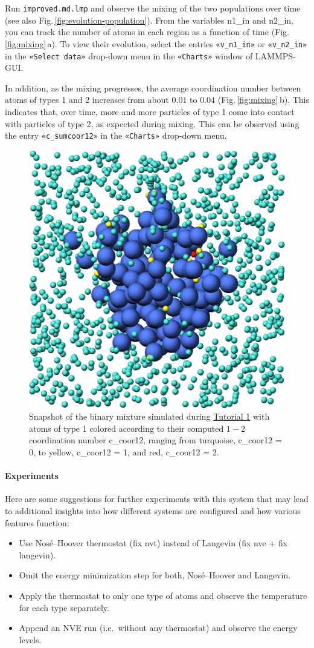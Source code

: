 \documentclass[9pt,tutorial]{livecoms}
\newcommand{\lmpcmd}[1]{\hspace{0pt}\colorbox{listing}{\textcolor{command}{\small{#1}}}\hspace{0pt}} %
\newcommand{\flecmd}[1]{\textcolor{command}{\texttt{#1}}} %
\newcommand{\guicmd}[1]{\textcolor{command}{\texttt{«#1»}}} %
\begin{document}
Run \flecmd{improved.md.lmp} and observe the mixing of the two populations
over time (see also Fig.\,\ref{fig:evolution-population}).  From the
variables \lmpcmd{n1\_in} and \lmpcmd{n2\_in}, you can track the number
of atoms in each region as a function of time
(Fig.\,\ref{fig:mixing}\,a).  To view their evolution, select the entries
\guicmd{v\_n1\_in} or \guicmd{v\_n2\_in} in the \guicmd{Select data} drop-down
menu in the \guicmd{Charts} window of LAMMPS-GUI.

In addition, as the mixing progresses, the average coordination number
between atoms of types 1 and 2 increases from about $0.01$ to $0.04$
(Fig.\,\ref{fig:mixing}\,b).  This indicates that, over time, more and
more particles of type 1 come into contact with particles of type 2, as
expected during mixing.  This can be observed using the entry
\guicmd{c\_sumcoor12} in the \guicmd{Charts} drop-down menu.

\begin{figure}
\centering
\includegraphics[width=0.55\linewidth]{LJ-coords}
\caption{Snapshot of the binary mixture simulated
  during \hyperref[lennard-jones-label]{Tutorial 1} with atoms of type 1
  colored according to their computed $1-2$ coordination
  number \lmpcmd{c\_coor12}, ranging from turquoise, \lmpcmd{c\_coor12 = 0},
  to yellow, \lmpcmd{c\_coor12 = 1}, and red, \lmpcmd{c\_coor12 = 2}.}
\label{fig:coords-viz}
\end{figure}

\paragraph{Experiments}

Here are some suggestions for further experiments with this system that
may lead to additional insights into how different systems are configured
and how various features function:
\begin{itemize}
\item Use Nos\'e--Hoover thermostat (\lmpcmd{fix nvt}) instead of Langevin
  (\lmpcmd{fix nve} + \lmpcmd{fix langevin}).
\item Omit the energy minimization step for both, Nos\'e--Hoover and Langevin.
\item Apply the thermostat to only one type of atoms and observe the
  temperature for each type separately.
\item Append an NVE run (i.e.~without any thermostat) and observe the energy levels.
\end{itemize}
\end{document}
